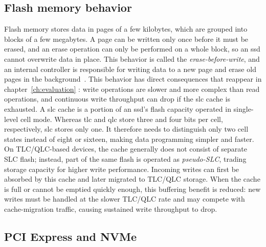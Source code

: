\subsection{Flash memory behavior}

Flash memory stores data in pages of a few kilobytes, which are grouped into blocks of a few megabytes. A page can be written only once before it must be erased, and an erase operation can only be performed on a whole block, so an \acrshort{ssd} cannot overwrite data in place. This behavior is called the \textit{erase-before-write}, and an internal controller is responsible for writing data to a new page and erase old pages in the background~\cite{agrawal_design_2008}. This behavior has direct consequences that reappear in chapter~\ref{ch:evaluation} : write operations are slower and more complex than read operations, and continuous write throughput can drop if the \acrfull{slc} cache is exhausted. A \acrshort{slc} cache is a portion of an \acrshort{ssd}'s flash capacity operated in single-level cell mode. Whereas \acrfull{tlc} and \acrfull{qlc} store three and four bits per cell, respectively, \acrshort{slc} stores only one. It therefore needs to distinguish only two cell states instead of eight or sixteen, making data programming simpler and faster. On TLC/QLC-based devices, the cache generally does not consist of separate SLC flash; instead, part of the same flash is operated as \textit{pseudo-SLC}, trading storage capacity for higher write performance. Incoming writes can first be absorbed by this cache and later migrated to TLC/QLC storage. When the cache is full or cannot be emptied quickly enough, this buffering benefit is reduced: new writes must be handled at the slower TLC/QLC rate and may compete with cache-migration traffic, causing sustained write throughput to drop.



\subsection{PCI Express and NVMe}

 

